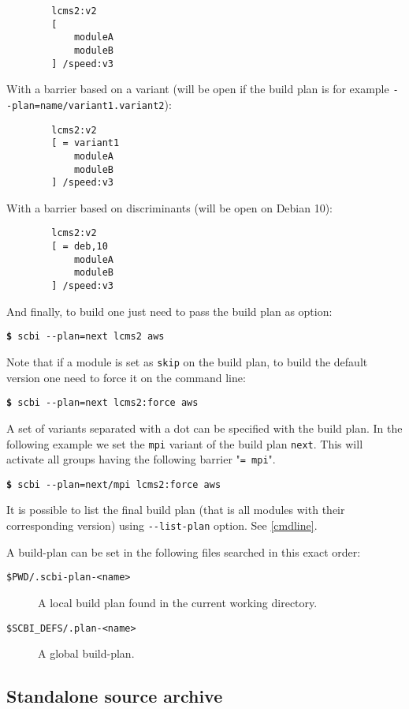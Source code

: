 \documentclass[a4paper,12pt,twoside]{article}
\newcommand{\code}[1]{\texttt{#1}}
\newcommand{\cmd}[1]{\tabto{1cm}\hspace{0.5cm}\texttt{\textbf{\$} #1}}
\newcommand{\ddash}{-{}-}
\begin{document}
\begin{description}
	\begin{lstlisting}
		lcms2:v2
		[
			moduleA
			moduleB
		] /speed:v3
	\end{lstlisting}

	With a barrier based on a variant (will be open if the build plan is for example \code{\ddash{}plan=name/variant1.variant2}):

	\begin{lstlisting}
		lcms2:v2
		[ = variant1
			moduleA
			moduleB
		] /speed:v3
	\end{lstlisting}

	With a barrier based on discriminants (will be open on Debian 10):

	\begin{lstlisting}
		lcms2:v2
		[ = deb,10
			moduleA
			moduleB
		] /speed:v3
	\end{lstlisting}
\end{description}

And finally, to build one just need to pass the build plan as option:

\cmd{scbi \ddash{}plan=next lcms2 aws}

Note that if a module is set as \code{skip} on the build plan, to build the default version one need to force it on the command line:

\cmd{scbi \ddash{}plan=next lcms2:force aws}

A set of variants separated with a dot can be specified with the build plan. In the following example we set the \code{mpi} variant of the build plan \code{next}. This will activate all groups having the following barrier "\code{= mpi}".

\cmd{scbi \ddash{}plan=next/mpi lcms2:force aws}

It is possible to list the final build plan (that is all modules with their corresponding version) using \code{\ddash{}list-plan} option. See \ref{cmdline}.

A build-plan can be set in the following files searched in this exact order:

\begin{description}
	\item[\code{\$PWD/.scbi-plan-<name>}] A local build plan found in the current working directory.

	\item[\code{\$SCBI\_DEFS/.plan-<name>}] A global build-plan.
\end{description}

\subsection{Standalone source archive}
\label{standalone}
\end{document}
